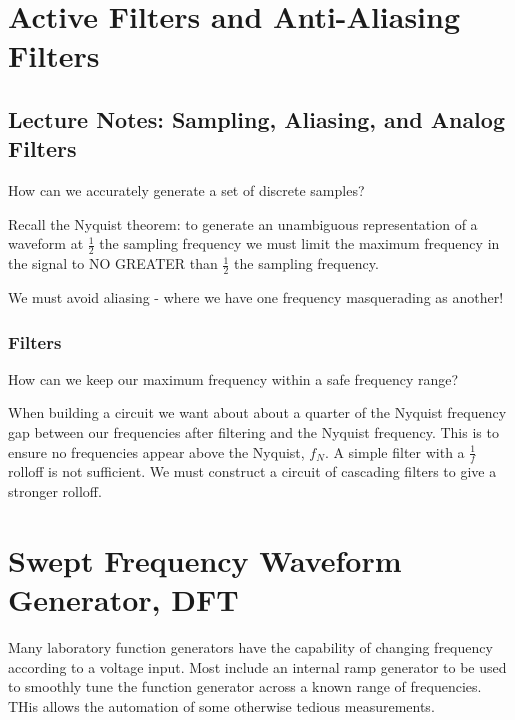 \documentclass[12pt, a4paper, oneside, openright, titlepage]{book}
\begin{document}
\chapter{Active Filters and Anti-Aliasing Filters}

\section{Lecture Notes: Sampling, Aliasing, and Analog Filters}

\begin{qst}
    How can we accurately generate a set of discrete samples?
\end{qst}
Recall the Nyquist theorem: to generate an unambiguous representation of a waveform at $\frac{1}{2}$ the sampling frequency we must limit the maximum frequency in the signal to NO GREATER than $\frac{1}{2}$ the sampling frequency. 

We must avoid aliasing - where we have one frequency masquerading as another! 

\subsection{Filters}

\begin{qst}
    How can we keep our maximum frequency within a safe frequency range?
\end{qst}

When building a circuit we want about about a quarter of the Nyquist frequency gap between our frequencies after filtering and the Nyquist frequency. This is to ensure no frequencies appear above the Nyquist, $f_N$. A simple filter with a $\frac{1}{f}$ rolloff is not sufficient. We must construct a circuit of cascading filters to give a stronger rolloff.





\chapter{Swept Frequency Waveform Generator, DFT}


Many laboratory function generators have the capability of changing frequency according to a voltage input. Most include an internal ramp generator to be used to smoothly tune the function generator across a known range of frequencies. THis allows the automation of some otherwise tedious measurements. 
\end{document}
